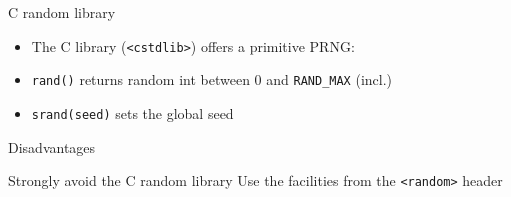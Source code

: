 \begin{frame}[fragile]
  \begin{block}{C random library}
    \begin{itemize}
      \item The C library (\texttt{<cstdlib>}) offers a primitive PRNG:
      \item \texttt{rand()} returns random int between 0 and \texttt{RAND_MAX} (incl.)
      \item \texttt{srand(seed)} sets the global seed
    \end{itemize}
  \end{block}
  \begin{alertblock}{Disadvantages}
  \end{alertblock}
  \begin{goodpractice}{Strongly avoid the C random library}
    Use the  facilities from the \texttt{<random>} header
  \end{goodpractice}
\end{frame}
